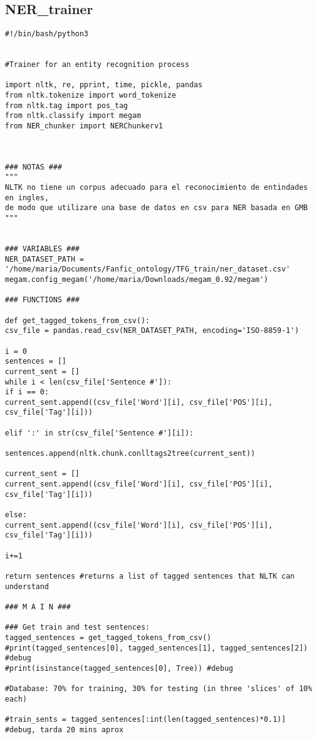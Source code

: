 \documentclass{pre-tfg}
\begin{document}
\subsection{NER\_trainer}
\begin{lstlisting}[style=consola]
#!/bin/bash/python3


#Trainer for an entity recognition process

import nltk, re, pprint, time, pickle, pandas
from nltk.tokenize import word_tokenize
from nltk.tag import pos_tag
from nltk.classify import megam
from NER_chunker import NERChunkerv1



### NOTAS ###
"""
NLTK no tiene un corpus adecuado para el reconocimiento de entindades en ingles,
de modo que utilizare una base de datos en csv para NER basada en GMB
"""


### VARIABLES ###
NER_DATASET_PATH = '/home/maria/Documents/Fanfic_ontology/TFG_train/ner_dataset.csv'
megam.config_megam('/home/maria/Downloads/megam_0.92/megam')

### FUNCTIONS ###

def get_tagged_tokens_from_csv():
csv_file = pandas.read_csv(NER_DATASET_PATH, encoding='ISO-8859-1')

i = 0
sentences = []
current_sent = []
while i < len(csv_file['Sentence #']):
if i == 0:
current_sent.append((csv_file['Word'][i], csv_file['POS'][i], 	csv_file['Tag'][i]))

elif ':' in str(csv_file['Sentence #'][i]): 

sentences.append(nltk.chunk.conlltags2tree(current_sent))

current_sent = []
current_sent.append((csv_file['Word'][i], csv_file['POS'][i], csv_file['Tag'][i]))

else:
current_sent.append((csv_file['Word'][i], csv_file['POS'][i], csv_file['Tag'][i]))

i+=1

return sentences #returns a list of tagged sentences that NLTK can understand

### M A I N ###

### Get train and test sentences:
tagged_sentences = get_tagged_tokens_from_csv()
#print(tagged_sentences[0], tagged_sentences[1], tagged_sentences[2]) #debug
#print(isinstance(tagged_sentences[0], Tree)) #debug

#Database: 70% for training, 30% for testing (in three 'slices' of 10% each)

#train_sents = tagged_sentences[:int(len(tagged_sentences)*0.1)] #debug, tarda 20 mins aprox


\end{lstlisting}
\end{document}
